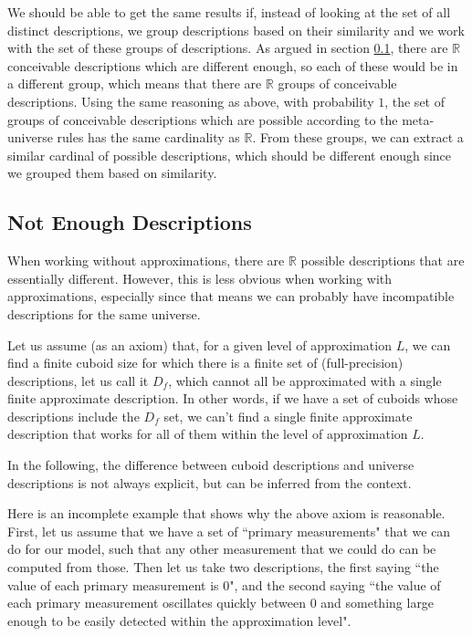 \documentclass[a4paper
,draft
]{article}
\def\reale{\mathbb{R}}
\newcommand{\ghilimele}[1]{``#1"}
\begin{document}
We should be able to get the same results if, instead of looking at the set
of all distinct descriptions, we group descriptions based on their similarity
and we work with the set of these groups of descriptions.
As argued in section \ref{sec:not-enough-descriptions},
there are $\reale$ conceivable descriptions which are different
enough, so each of these would be in a different group, which means that
there are $\reale$ groups of conceivable descriptions.
Using the same reasoning as above, with probability $1$, the set of groups of
conceivable descriptions which are possible according to the meta-universe
rules has the same cardinality as $\reale$.
From these groups, we can extract a similar cardinal of
possible descriptions, which should be different enough since we grouped them
based on similarity.

\subsection{Not Enough Descriptions}
\label{sec:not-enough-descriptions}

When working without approximations, there are $\reale$ possible descriptions
that are essentially different. However, this is less obvious when working with
approximations, especially since that means we can probably have incompatible
descriptions for the same universe.

Let us assume (as an axiom) that, for a given level of approximation $L$, we can
find a finite cuboid size for which there is a finite set of
(full-precision)
descriptions, let us call it $D_f$, which cannot all be approximated with a
single finite approximate description.
In other words, if we have a set of cuboids whose descriptions include
the $D_f$ set, we can't
find a single finite approximate description that works for all of them
within the level of approximation $L$.

In the following, the difference between
cuboid descriptions and universe descriptions is not always explicit,
but can be inferred from the context.

Here is an incomplete example that shows why the above axiom is reasonable.
First, let us assume that we have a set of
\ghilimele{primary measurements} that we
can do for our model, such that any other measurement that we could do can be
computed from those.
Then let us take two descriptions, the first saying
\ghilimele{the value of each primary measurement is $0$},
and the second saying
\ghilimele{the value of each primary measurement oscillates quickly
  between $0$ and something large enough to be easily detected within
  the approximation level}.
\end{document}
